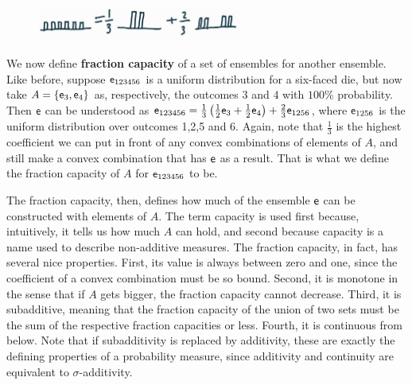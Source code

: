 \begin{figure}[h]
	\centering
	\includegraphics[width=0.6\textwidth]{tempimages/FractionCapacity.jpg}
\end{figure}

We now define \textbf{fraction capacity} of a set of ensembles for another ensemble. Like before, suppose $\mathsf{e}_{123456}$ is a uniform distribution for a six-faced die, but now take $A = \{ \mathsf{e}_3, \mathsf{e}_4 \}$ as, respectively, the outcomes $3$ and $4$ with $100\%$ probability. Then $\mathsf{e}$ can be understood as $\mathsf{e}_{123456} = \frac{1}{3} \left(\frac{1}{2} \mathsf{e}_3 + \frac{1}{2} \mathsf{e}_4 \right) + \frac{2}{3} \mathsf{e}_{1256}$, where $\mathsf{e}_{1256}$ is the uniform distribution over outcomes 1,2,5 and 6. Again, note that $\frac{1}{3}$ is the highest coefficient we can put in front of any convex combinations of elements of $A$, and still make a convex combination that has $\mathsf{e}$ as a result. That is what we define the fraction capacity of $A$ for $\mathsf{e}_{123456}$ to be.

The fraction capacity, then, defines how much of the ensemble $\mathsf{e}$ can be constructed with elements of $A$. The term capacity is used first because, intuitively, it tells us how much $A$ can hold, and second because capacity is a name used to describe non-additive measures. The fraction capacity, in fact, has several nice properties. First, its value is always between zero and one, since the coefficient of a convex combination must be so bound. Second, it is monotone in the sense that if $A$ gets bigger, the fraction capacity cannot decrease. Third, it is subadditive, meaning that the fraction capacity of the union of two sets must be the sum of the respective fraction capacities or less. Fourth, it is continuous from below. Note that if subadditivity is replaced by additivity, these are exactly the defining properties of a probability measure, since additivity and continuity are equivalent to $\sigma$-additivity.

